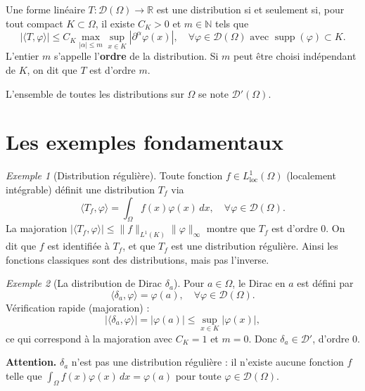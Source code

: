 \documentclass[12pt,a4paper,openany]{book}
\theoremstyle{definition}
\theoremstyle{plain}
\theoremstyle{remark}
\newtheorem*{example}{Exemple}
\begin{document}
	\begin{definition}
		Une forme linéaire $T : \mathcal{D}(\Omega) \to \mathbb{R}$ est une distribution si et seulement si, pour tout compact $K \subset \Omega$, il existe $C_K > 0$ et $m \in \mathbb{N}$ tels que
		\[
		|\langle T, \varphi \rangle| \le C_K \max_{|\alpha| \le m} \sup_{x \in K} |\partial^\alpha \varphi(x)|, \quad \forall \varphi \in \mathcal{D}(\Omega) \text{ avec } \operatorname{supp}(\varphi) \subset K.
		\]
		L'entier $m$ s'appelle l'\textbf{ordre} de la distribution. Si $m$ peut être choisi indépendant de $K$, on dit que $T$ est d'ordre $m$.
	\end{definition}
	
	L'ensemble de toutes les distributions sur $\Omega$ se note $\mathcal{D}'(\Omega)$.
	
	\section{Les exemples fondamentaux}
	
	\begin{example}[Distribution régulière]
		Toute fonction $f \in L_{\text{loc}}^1(\Omega)$ (localement intégrable) définit une distribution $T_f$ via
		\[
		\langle T_f, \varphi \rangle = \int_{\Omega} f(x) \varphi(x) \, dx, \quad \forall \varphi \in \mathcal{D}(\Omega).
		\]
		La majoration $|\langle T_f, \varphi \rangle| \le \|f\|_{L^1(K)} \|\varphi\|_\infty$ montre que $T_f$ est d'ordre $0$. On dit que $f$ est identifiée à $T_f$, et que $T_f$ est une distribution régulière. Ainsi les fonctions classiques sont des distributions, mais pas l'inverse.
	\end{example}
	
	\begin{example}[La distribution de Dirac $\delta_a$]
		Pour $a \in \Omega$, le Dirac en $a$ est défini par
		\[
		\langle \delta_a, \varphi \rangle = \varphi(a), \quad \forall \varphi \in \mathcal{D}(\Omega).
		\]
		Vérification rapide (majoration) :
		\[
		|\langle \delta_a, \varphi \rangle| = |\varphi(a)| \le \sup_{x \in K} |\varphi(x)|,
		\]
		ce qui correspond à la majoration avec $C_K = 1$ et $m = 0$. Donc $\delta_a \in \mathcal{D}'$, d'ordre $0$.
		
		\textbf{Attention.} $\delta_a$ n'est pas une distribution régulière : il n'existe aucune fonction $f$ telle que $\int_\Omega f(x)\varphi(x)\,dx = \varphi(a)$ pour toute $\varphi \in \mathcal{D}(\Omega)$.
	\end{example}
	
\end{document}
